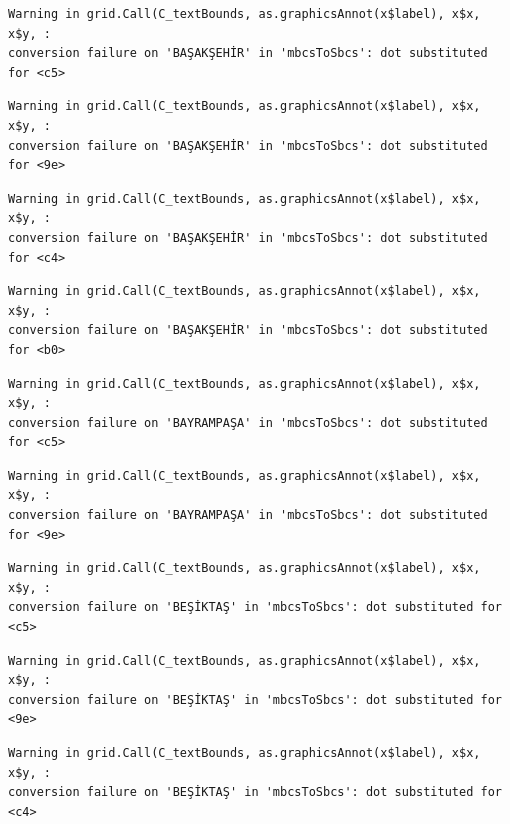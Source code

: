 \documentclass[
  11pt,
  a4paper,
  DIV=11,
  numbers=noendperiod]{scrartcl}
\begin{document}
\begin{verbatim}
Warning in grid.Call(C_textBounds, as.graphicsAnnot(x$label), x$x, x$y, :
conversion failure on 'BAŞAKŞEHİR' in 'mbcsToSbcs': dot substituted for <c5>
\end{verbatim}

\begin{verbatim}
Warning in grid.Call(C_textBounds, as.graphicsAnnot(x$label), x$x, x$y, :
conversion failure on 'BAŞAKŞEHİR' in 'mbcsToSbcs': dot substituted for <9e>
\end{verbatim}

\begin{verbatim}
Warning in grid.Call(C_textBounds, as.graphicsAnnot(x$label), x$x, x$y, :
conversion failure on 'BAŞAKŞEHİR' in 'mbcsToSbcs': dot substituted for <c4>
\end{verbatim}

\begin{verbatim}
Warning in grid.Call(C_textBounds, as.graphicsAnnot(x$label), x$x, x$y, :
conversion failure on 'BAŞAKŞEHİR' in 'mbcsToSbcs': dot substituted for <b0>
\end{verbatim}

\begin{verbatim}
Warning in grid.Call(C_textBounds, as.graphicsAnnot(x$label), x$x, x$y, :
conversion failure on 'BAYRAMPAŞA' in 'mbcsToSbcs': dot substituted for <c5>
\end{verbatim}

\begin{verbatim}
Warning in grid.Call(C_textBounds, as.graphicsAnnot(x$label), x$x, x$y, :
conversion failure on 'BAYRAMPAŞA' in 'mbcsToSbcs': dot substituted for <9e>
\end{verbatim}

\begin{verbatim}
Warning in grid.Call(C_textBounds, as.graphicsAnnot(x$label), x$x, x$y, :
conversion failure on 'BEŞİKTAŞ' in 'mbcsToSbcs': dot substituted for <c5>
\end{verbatim}

\begin{verbatim}
Warning in grid.Call(C_textBounds, as.graphicsAnnot(x$label), x$x, x$y, :
conversion failure on 'BEŞİKTAŞ' in 'mbcsToSbcs': dot substituted for <9e>
\end{verbatim}

\begin{verbatim}
Warning in grid.Call(C_textBounds, as.graphicsAnnot(x$label), x$x, x$y, :
conversion failure on 'BEŞİKTAŞ' in 'mbcsToSbcs': dot substituted for <c4>
\end{verbatim}
\end{document}
